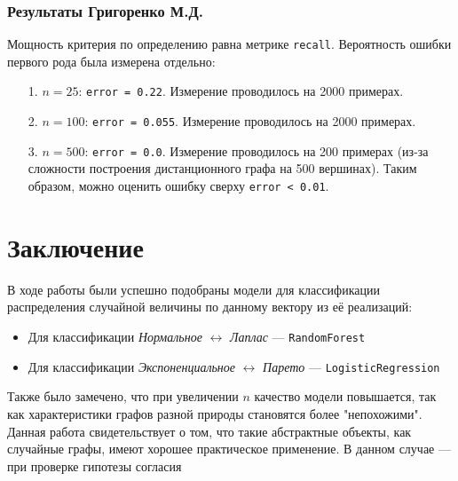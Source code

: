 \documentclass[a4paper,12pt]{article}
\begin{document}
\subsubsection*{Результаты Григоренко М.Д.}
Мощность критерия по определению равна метрике \texttt{recall}. Вероятность ошибки первого рода была измерена отдельно:
\begin{itemize}
    \item[1.] $n = 25$: \texttt{error = 0.22}. Измерение проводилось на 2000 примерах.
    \item[2.] $n = 100$: \texttt{error = 0.055}. Измерение проводилось на 2000 примерах.
    \item[3.] $n = 500$: \texttt{error = 0.0}. Измерение проводилось на 200 примерах (из-за сложности построения дистанционного графа на 500 вершинах). Таким образом, можно оценить ошибку сверху \texttt{error < 0.01}.
\end{itemize}
\section{Заключение}
В ходе работы были успешно подобраны модели для классификации распределения случайной величины по данному вектору из её реализаций:
\begin{itemize}
    \item Для классификации \textit{Нормальное} $\leftrightarrow$ \textit{Лаплас} --- \texttt{RandomForest}
    \item Для классификации \textit{Экспоненциальное} $\leftrightarrow$ \textit{Парето} --- \texttt{LogisticRegression}
\end{itemize}
Также было замечено, что при увеличении $n$ качество модели повышается, так как характеристики графов разной природы становятся более "непохожими". \\
Данная работа свидетельствует о том, что такие абстрактные объекты, как случайные графы, имеют хорошее практическое применение. В данном случае --- при проверке гипотезы согласия
\end{document}

